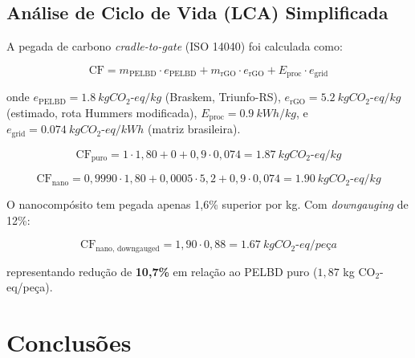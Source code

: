 \documentclass[12pt,a4paper,twoside]{article}
\begin{document}
\subsection{Análise de Ciclo de Vida (LCA) Simplificada}

A pegada de carbono \textit{cradle-to-gate} (ISO 14040) foi calculada como:

\begin{equation}
\text{CF} = m_{\text{PELBD}} \cdot e_{\text{PELBD}} + m_{\text{rGO}} \cdot e_{\text{rGO}} + E_{\text{proc}} \cdot e_{\text{grid}}
\label{eq:carbon_footprint}
\end{equation}

onde $e_{\text{PELBD}} = \SI{1,8}{kg CO_2\text{-}eq/kg}$ (Braskem, Triunfo-RS), $e_{\text{rGO}} = \SI{5,2}{kg CO_2\text{-}eq/kg}$ (estimado, rota Hummers modificada), $E_{\text{proc}} = \SI{0,9}{kWh/kg}$, e $e_{\text{grid}} = \SI{0,074}{kg CO_2\text{-}eq/kWh}$ (matriz brasileira).

\begin{equation}
\text{CF}_{\text{puro}} = 1 \cdot 1,80 + 0 + 0,9 \cdot 0,074 = \SI{1,87}{kg CO_2\text{-}eq/kg}
\end{equation}

\begin{equation}
\text{CF}_{\text{nano}} = 0,9990 \cdot 1,80 + 0,0005 \cdot 5,2 + 0,9 \cdot 0,074 = \SI{1,90}{kg CO_2\text{-}eq/kg}
\end{equation}

O nanocompósito tem pegada apenas 1,6\% superior por kg. Com \textit{downgauging} de 12\%:

\begin{equation}
\text{CF}_{\text{nano, downgauged}} = 1,90 \cdot 0,88 = \SI{1,67}{kg CO_2\text{-}eq/peça}
\end{equation}

representando redução de \textbf{10,7\%} em relação ao PELBD puro ($1,87$ kg CO$_2$-eq/peça).

\section{Conclusões}
\end{document}
